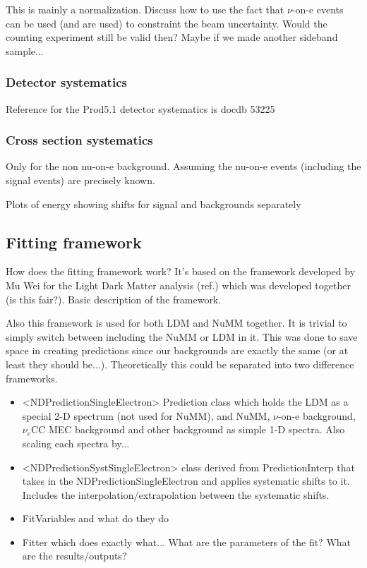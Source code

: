
This is mainly a normalization. Discuss how to use the fact that $\nu$-on-e events can be used (and are used) to constraint the beam uncertainty. Would the counting experiment still be valid then? Maybe if we made another sideband sample...

\subsubsection*{Detector systematics}
Reference for the Prod5.1 detector systematics is docdb 53225

\subsubsection*{Cross section systematics}
Only for the non nu-on-e background. Assuming the nu-on-e events (including the signal events) are precisely known.

Plots of energy showing shifts for signal and backgrounds separately

\subsection{Fitting framework}
How does the fitting framework work? It's based on the framework developed by Mu Wei for the Light Dark Matter analysis (ref.) which was developed together (is this fair?). Basic description of the framework.

Also this framework is used for both LDM and NuMM together. It is trivial to simply switch between including the NuMM or LDM in it. This was done to save space in creating predictions since our backgrounds are exactly the same (or at least they should be...). Theoretically this could be separated into two difference frameworks.

\begin{itemize}
\item <NDPredictionSingleElectron> Prediction class which holds the LDM as a special 2-D spectrum (not used for NuMM), and NuMM, $\nu$-on-e background, $\nu_e$CC MEC background and other background as simple 1-D spectra. Also scaling each spectra by...
\item <NDPredictionSystSingleElectron> class derived from PredictionInterp that takes in the NDPredictionSingleElectron and applies systematic shifts to it. Includes the interpolation/extrapolation between the systematic shifts.
\item FitVariables and what do they do
\item Fitter which does exactly what... What are the parameters of the fit? What are the results/outputs?
\end{itemize}